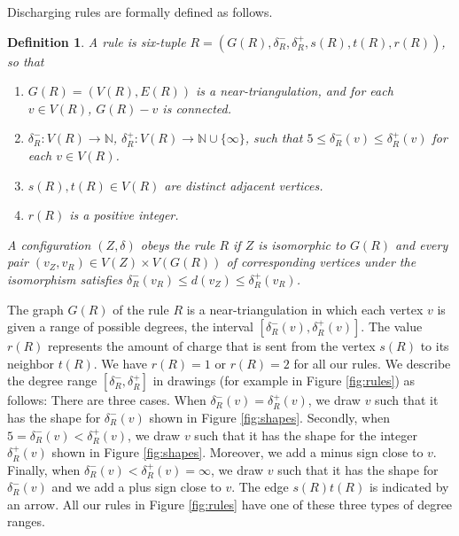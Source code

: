\documentclass[10pt,a4paper]{article}
\newtheorem{dfn}[thm]{Definition}
\def\showlabel#1{}
\begin{document}
Discharging rules are formally defined as follows. 

\begin{dfn}\label{dfn:rule}\showlabel{dfn:rule}
  A \emph{rule} is six-tuple $R = (G(R), \delta^-_R, \delta^+_R, s(R), t(R), r(R))$, so that
  \begin{enumerate}
      \renewcommand{\labelenumi}{(\roman{enumi})}
      \item $G(R) = (V(R), E(R))$ is a near-triangulation, and for each $v \in V(R)$, $G(R) - v$ is connected.
      \item $\delta^-_R \colon V(R) \rightarrow \mathbb{N}$, $\delta^+_R \colon V(R) \rightarrow \mathbb{N} \cup \{\infty\}$, such that $5 \leq \delta^-_R(v) \leq \delta^+_R(v)$ for each $v \in V(R)$.
      \item $s(R), t(R) \in V(R)$ are distinct adjacent vertices.
      \item $r(R)$ is a positive integer.
  \end{enumerate}
  A configuration $(Z,\delta)$ \emph{obeys} the rule $R$ if $Z$ is isomorphic to $G(R)$ and every pair $(v_Z, v_R) \in V(Z) \times V(G(R))$ of corresponding vertices under the isomorphism satisfies $\delta^-_R(v_R) \leq d(v_Z) \leq \delta^+_R(v_R)$.
\end{dfn}

The graph $G(R)$ of the rule $R$ is a near-triangulation in which each vertex $v$ is given a range of possible degrees, the interval $[\delta^-_R(v), \delta^+_R(v)]$. The value $r(R)$ represents the amount of charge that is sent from the vertex $s(R)$ to its neighbor $t(R)$. We have $r(R) = 1$ or $r(R)=2$ for all our rules. We describe the degree range $[\delta^-_R, \delta^+_R]$ 
in drawings (for example in Figure \ref{fig:rules}) as follows:
There are three cases. When $\delta^-_R(v) = \delta^+_R(v)$, we 
draw $v$ such that it has the shape for $\delta^-_R(v)$ shown in Figure \ref{fig:shapes}. 
Secondly, when $5 = \delta^-_R(v) < \delta^+_R(v)$, we 
draw $v$ such that it has the shape for the integer $\delta^+_R(v)$ shown in Figure \ref{fig:shapes}. Moreover, we add a minus sign close to $v$. 
Finally, when $\delta^-_R(v) < \delta^+_R(v) = \infty$, we 
draw $v$ such that it has the shape for $\delta^-_R(v)$ and we add a plus sign close to $v$. The edge $s(R)t(R)$ is indicated by an arrow. All our rules in Figure \ref{fig:rules} have one of these three types of degree ranges. 
\end{document}
